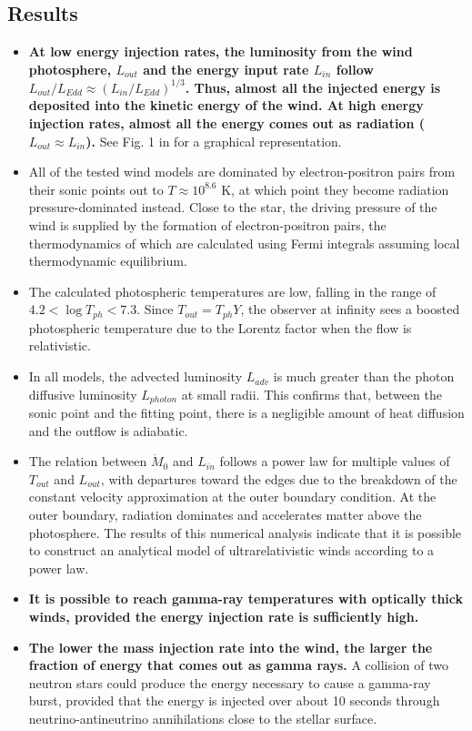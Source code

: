 \documentclass[onecolumn]{aastex63}
\begin{document}
\subsection{Results}
\begin{itemize}
    \item \textbf{At low energy injection rates, the luminosity from the wind photosphere, $L_{out}$ and the energy input rate $L_{in}$ follow $L_{out}/L_{Edd} \approx (L_{in}/L_{Edd})^{1/3}$. Thus, almost all the injected energy is deposited into the kinetic energy of the wind. At high energy injection rates, almost all the energy comes out as radiation ($L_{out} \approx L_{in}$).} See Fig. 1 in \cite{paczynski1990} for a graphical representation.
    \item All of the tested wind models are dominated by electron-positron pairs from their sonic points out to $T \approx 10^{8.6}$ K, at which point they become radiation pressure-dominated instead. Close to the star, the driving pressure of the wind is supplied by the formation of electron-positron pairs, the thermodynamics of which are calculated using Fermi integrals assuming local thermodynamic equilibrium. 
    \item The calculated photospheric temperatures are low, falling in the range of $4.2 < \log {T_{ph}} < 7.3$. Since $T_{out} = T_{ph}Y$, the observer at infinity sees a boosted photospheric temperature due to the Lorentz factor when the flow is relativistic.
    \item In all models, the advected luminosity $L_{adv}$ is much greater than the photon diffusive luminosity $L_{photon}$ at small radii. This confirms that, between the sonic point and the fitting point, there is a negligible amount of heat diffusion and the outflow is adiabatic.
    \item The relation between $\dot M_0$ and $L_{in}$ follows a power law for multiple values of $T_{out}$ and $L_{out}$, with departures toward the edges due to the breakdown of the constant velocity approximation at the outer boundary condition. At the outer boundary, radiation dominates and accelerates matter above the photosphere. The results of this numerical analysis indicate that it is possible to construct an analytical model of ultrarelativistic winds according to a power law.
    \item \textbf{It is possible to reach gamma-ray temperatures with optically thick winds, provided the energy injection rate is sufficiently high.}
    \item \textbf{The lower the mass injection rate into the wind, the larger the fraction of energy that comes out as gamma rays.} A collision of two neutron stars could produce the energy necessary to cause a gamma-ray burst, provided that the energy is injected over about 10 seconds through neutrino-antineutrino annihilations close to the stellar surface.
\end{itemize}
    
\end{document}
